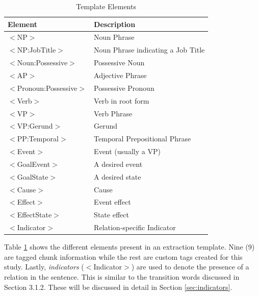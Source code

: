 \begin{table}[H]   %
\centering
\caption{Template Elements} \vspace{0.25em}
\begin{tabular}{|p{4cm}|p{6.5cm}|} \hline
\textbf{Element} & \textbf{Description} \\ \hline
$<$NP$>$					& Noun Phrase \\ \hline
$<$NP:JobTitle$>$			& Noun Phrase indicating a Job Title \\ \hline
$<$Noun:Possessive$>$		& Possessive Noun \\ \hline
$<$AP$>$					& Adjective Phrase \\ \hline
$<$Pronoun:Possessive$>$	& Possessive Pronoun \\ \hline
$<$Verb$>$					& Verb in root form \\ \hline
$<$VP$>$					& Verb Phrase \\ \hline
$<$VP:Gerund$>$				& Gerund \\ \hline
$<$PP:Temporal$>$			& Temporal Prepositional Phrase \\ \hline
$<$Event$>$					& Event (usually a VP) \\ \hline
$<$GoalEvent$>$				& A desired event \\ \hline
$<$GoalState$>$				& A desired state \\ \hline
$<$Cause$>$					& Cause \\ \hline
$<$Effect$>$				& Event effect \\ \hline
$<$EffectState$>$			& State effect \\ \hline
$<$Indicator$>$				& Relation-specific Indicator \\ \hline
\end{tabular}
\label{tab:templateelements}
\end{table}

Table \ref{tab:templateelements} shows the different elements present in an extraction template. Nine (9) are tagged chunk information while the rest are custom tags created for this study. Lastly, \textit{indicators} ($<$Indicator$>$) are used to denote the presence of a relation in the sentence. This is similar to the transition words discussed in Section 3.1.2. These will be discussed in detail in Section \ref{sec:indicators}.

